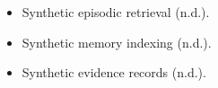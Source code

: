 \begin{itemize}
\item Synthetic episodic retrieval (n.d.).
\item Synthetic memory indexing (n.d.).
\item Synthetic evidence records (n.d.).
\end{itemize}
